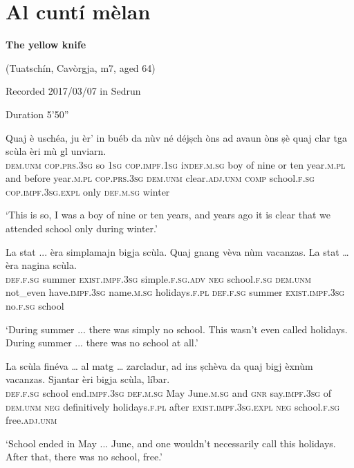 \section{Al cuntí mèlan}\label{sec:8.17}

\noindent
\textbf{The yellow knife}

\noindent
(Tuatschín, Cavòrgja, m7, aged 64)

\noindent
Recorded 2017/03/07 in Sedrun

\noindent
Duration 5'50''

\bigskip

\begin{linenumbers}
	\gll Quaj è uschéa, ju èr’ in buéb da nùv né déjṣch òns ad avaun òns ṣè quaj clar tga scùla èri mù gl unviarn.   \\
	\textsc{dem.unm} \textsc{cop.prs.3sg} so \textsc{1sg} \textsc{cop.impf.1sg} i\textsc{ndef.m.sg} boy of nine or ten year.\textsc{m.pl} and before year\textsc{.m.pl} \textsc{cop.prs.3sg} \textsc{dem.unm} clear.\textsc{adj.unm} \textsc{comp} school.\textsc{f.sg} \textsc{cop.impf.3sg.expl} only \textsc{def.m.sg} winter\\
\end{linenumbers}
\medskip
\glt `This is so, I was a boy of nine or ten years, and years ago it is clear that we attended school only during winter.'
\medskip

\begin{linenumbers}
	\gll  La stat ... èra simplamajn bigja scùla. Quaj gnang vèva nùm vacanzas. La stat … èra nagina scùla.  \\
\textsc{def.f.sg} summer {} \textsc{exist.impf.3sg} simple.\textsc{f.sg.adv} \textsc{neg} school.\textsc{f.sg} \textsc{dem.unm} not\_even have.\textsc{impf.3sg} name.\textsc{m.sg} holidays.\textsc{f.pl} \textsc{def.f.sg} summer {} \textsc{exist.impf.3sg} no.\textsc{f.sg} school \\
\end{linenumbers}
\medskip
\glt `During summer ... there was simply no school. This wasn't even called holidays. During summer ... there was no school at all.'
\medskip

\begin{linenumbers}
	\gll  La scùla finéva … al matg … zarcladur, ad ins ṣchèva da quaj bigj èxnùm vacanzas. Sjantar èri bigja scùla, líbar.  \\
	\textsc{def.f.sg} school end.\textsc{impf.3sg} {} \textsc{def.m.sg} May {} June.\textsc{m.sg} and \textsc{gnr} say.\textsc{impf.3sg} of \textsc{dem.unm} \textsc{neg} definitively holidays.\textsc{f.pl} after \textsc{exist.impf.3sg.expl} \textsc{neg} school.\textsc{f.sg} free.\textsc{adj.unm}    \\
\end{linenumbers}
\medskip
\glt `School ended in May ... June, and one wouldn't necessarily call this holidays. After that, there was no school, free.'
\medskip

